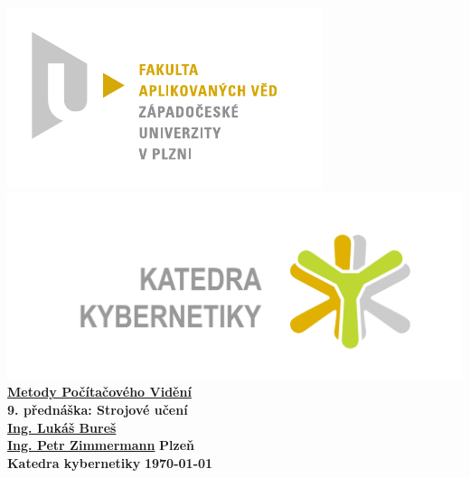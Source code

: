 \documentclass[12pt, a4paper]{report}
\begin{document}
\begin{titlepage}
\begin{center}
	\includegraphics[trim = 0.6cm 0.5cm 0.9cm 0.5cm, scale=1]{./Img/FAV_logo_cz.pdf}
	\hspace*{\fill}
	\includegraphics[trim = 3.5cm 1.5cm 2.6cm 2cm, scale=0.295]{./Img/KKY_logo_cz.pdf}\\
	\vspace*{\fill}
	\textbf{\Huge{\href{http://www.kky.zcu.cz/cs/courses/mpv}{Metody Počítačového Vidění} \\ 9. přednáška: Strojové učení}}\\
	\vspace*{\fill}
	\textbf{\large{\href{mailto:LBures@kky.zcu.cz}{Ing. Lukáš Bureš}}} \hfill ~\\
	\textbf{\large{\href{mailto:PetrZim@kky.zcu.cz}{Ing. Petr Zimmermann}}} \hfill \textbf{\large{Plzeň}}\\
	\textbf{\large{Katedra kybernetiky}} \hfill \textbf{\large{\today}}
\end{center}
\end{titlepage}









\setcounter{page}{1}

\tableofcontents
\newpage

\setcounter{page}{1}









\end{document}
